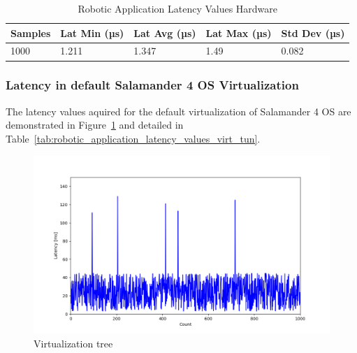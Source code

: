 \documentclass[MMR,Master,english]{twbook}
\begin{document}
\begin{table}[H]
	\centering
	\caption{Robotic Application Latency Values Hardware}
	\label{tab:robotic_application_latency_values_hardware}
	\setlength{\tabcolsep}{0.5em} %
	{\renewcommand{\arraystretch}{1.2}%
		\begin{tabular}{|l|l|l|l|l|}
			\hline
			\textbf{Samples} & \textbf{Lat Min (µs)} & \textbf{Lat Avg (µs)} & \textbf{Lat Max (µs)} & \textbf{Std Dev (µs)} \\ \hline

			1000             & 1.211                 & 1.347                  & 1.49                  & 0.082                   \\ \hline
		\end{tabular}}
\end{table}

\clearpage

\subsubsection{Latency in default Salamander 4 OS Virtualization}\label{subsubsec:latency_virtualization}
\noindent The latency values aquired for the default virtualization of Salamander 4 OS are demonstrated in Figure~\ref{fig:untuned_virt_latencies} and detailed in Table~\ref{tab:robotic_application_latency_values_virt_tun}. 

\begin{figure}[H]
	\centering
	\includegraphics[width=1.0\columnwidth]{masterthesis-documentation/docs/resources/scripts/experiment/generated_latencies/untuned_virt_latencies.png}
	\caption[Virtualization tree]{Virtualization tree}
	\label{fig:untuned_virt_latencies}
\end{figure}
\end{document}
